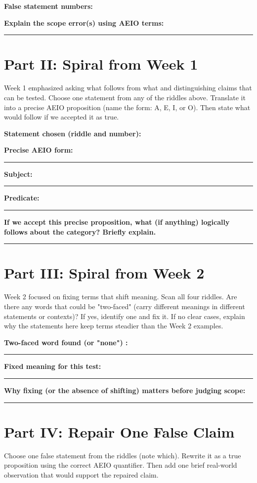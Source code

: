 \documentclass[12pt]{article}
\newcommand{\studentline}{\par\vspace{0.60em}\hrule\vspace{0.64em}}
\newcommand{\shortline}{\par\vspace{0.38em}\hrule\vspace{0.48em}}
\begin{document}
\textbf{False statement numbers:} \hrulefill

\textbf{Explain the scope error(s) using AEIO terms:}\studentline

\clearpage

\section*{Part II: Spiral from Week 1}

Week 1 emphasized asking what follows from what and distinguishing claims that can be tested. Choose one statement from any of the riddles above. Translate it into a precise AEIO proposition (name the form: A, E, I, or O). Then state what would follow if we accepted it as true.

\textbf{Statement chosen (riddle and number):} \hrulefill

\textbf{Precise AEIO form:}\shortline

\textbf{Subject:}\shortline

\textbf{Predicate:}\shortline

\textbf{If we accept this precise proposition, what (if anything) logically follows about the category? Briefly explain.}\studentline

\Needspace{0.35\textheight}

\section*{Part III: Spiral from Week 2}

Week 2 focused on fixing terms that shift meaning. Scan all four riddles. Are there any words that could be "two-faced" (carry different meanings in different statements or contexts)? If yes, identify one and fix it. If no clear cases, explain why the statements here keep terms steadier than the Week 2 examples.

\textbf{Two-faced word found (or "none") :}\shortline

\textbf{Fixed meaning for this test:}\shortline

\textbf{Why fixing (or the absence of shifting) matters before judging scope:}\studentline

\Needspace{0.35\textheight}

\section*{Part IV: Repair One False Claim}

Choose one false statement from the riddles (note which). Rewrite it as a true proposition using the correct AEIO quantifier. Then add one brief real-world observation that would support the repaired claim.
\end{document}
